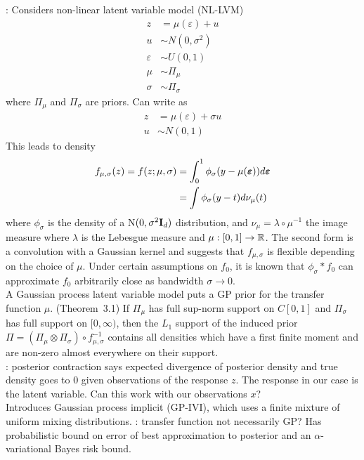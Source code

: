 \documentclass[10pt]{article}
\begin{document}
\todo: Considers non-linear latent variable model (NL-LVM)
\begin{align*}
z &= \mu(\varepsilon) + u \\
u &\sim N(0,\sigma^2) \\
\varepsilon &\sim U(0,1) \\
\mu &\sim \Pi_\mu \\
\sigma &\sim \Pi_\sigma
\end{align*}
where $\Pi_\mu$ and $\Pi_\sigma$ are priors. Can write as
\begin{align*}
z &= \mu(\varepsilon) + \sigma u \\
u &\sim N(0,1)
\end{align*}
This leads to density
\begin{align*}
f_{\mu,\sigma}(z) = f(z;\mu,\sigma) &= \int_0^1\phi_\sigma(y-\mu(\bm{\varepsilon}))d\bm{\varepsilon} \\
&= \int \phi_\sigma(y-t)d\nu_\mu(t)
\end{align*}
where $\phi_\sigma$ is the density of a N$(0,\sigma^2\mathbf{I}_d)$ distribution, and $\nu_\mu=\lambda\circ\mu^{-1}$ the image measure where $\lambda$ is the Lebesgue measure and $\mu:[0,1]\rightarrow\mathbb{R}$. The second form is a convolution with a Gaussian kernel and suggests that $f_{\mu,\sigma}$ is flexible depending on the choice of $\mu$. Under certain assumptions on $f_0$, it is known that $\phi_\sigma*f_0$ can approximate $f_0$ arbitrarily close as bandwidth $\sigma\rightarrow 0$.
\\

A Gaussian process latent variable model puts a GP prior for the transfer function $\mu$. (Theorem~3.1) If $\Pi_\mu$ has full sup-norm support on $C[0,1]$ and $\Pi_\sigma$ has full support on $[0,\infty)$, then the $L_1$ support of the induced prior $\Pi=(\Pi_\mu\otimes\Pi_\sigma)\circ f_{\mu,\sigma}^{-1}$ contains all densities which have a first finite moment and are non-zero almost everywhere on their support.
\\

\todo: posterior contraction says expected divergence of posterior density and true density goes to 0 given observations of the response $z$. The response in our case is the latent variable. Can this work with our observations $x$?
\\

Introduces Gaussian process implicit \vi (GP-IVI), which uses a finite mixture of uniform mixing distributions. \todo: transfer function not necessarily GP? Has probabilistic bound on error of best approximation to posterior and an $\alpha$-variational Bayes risk bound.
\\
\end{document}
